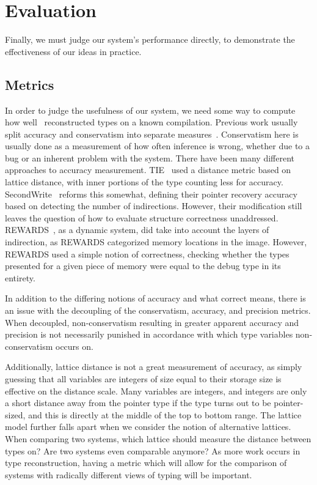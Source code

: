 \section{Evaluation}
\label{sec:eval}
Finally, we must judge our system's performance directly, to demonstrate the effectiveness of our ideas in practice.
\subsection{Metrics}
\label{subsec:metrics}
In order to judge the usefulness of our system, we need some way to compute how well \bitr\ reconstructed types on a known compilation. Previous work usually split accuracy and conservatism into separate measures~\cite{tie,sw}. Conservatism here is usually done as a measurement of how often inference is wrong, whether due to a bug or an inherent problem with the system. There have been many different approaches to accuracy measurement. TIE~\cite{tie} used a distance metric based on lattice distance, with inner portions of the type counting less for accuracy. SecondWrite~\cite{sw} reforms this somewhat, defining their pointer recovery accuracy based on detecting the number of indirections. However, their modification still leaves the question of how to evaluate structure correctness unaddressed. REWARDS~\cite{rewards}, as a dynamic system, did take into account the layers of indirection, as REWARDS categorized memory locations in the image. However, REWARDS used a simple notion of correctness, checking whether the types presented for a given piece of memory were equal to the debug type in its entirety.

In addition to the differing notions of accuracy and what correct means, there is an issue with the decoupling of the conservatism, accuracy, and precision metrics. When decoupled, non-conservatism resulting in greater apparent accuracy and precision is not necessarily punished in accordance with which type variables non-conservatism occurs on.

Additionally, lattice distance is not a great measurement of accuracy, as simply guessing that all variables are integers of size equal to their storage size is effective on the distance scale. Many variables are integers, and integers are only a short distance away from the pointer type if the type turns out to be pointer-sized, and this is directly at the middle of the top to bottom range. The lattice model further falls apart when we consider the notion of alternative lattices. When comparing two systems, which lattice should measure the distance between types on? Are two systems even comparable anymore? As more work occurs in type reconstruction, having a metric which will allow for the comparison of systems with radically different views of typing will be important.

